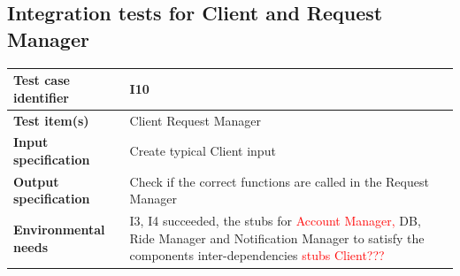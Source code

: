 \documentclass[a4paper,11pt]{report} %
\begin{document}
		\subsection{Integration tests for Client and Request Manager}
			\begin{minipage}{\linewidth}
			\end{minipage}		
		\begin{center}
			\renewcommand{\arraystretch}{1.2}
			\setlength{\tabcolsep}{24pt}
			\begin{tabular}{ l  p{9cm}}\hline
				\textbf{Test case identifier} & I10\\\hline
				\textbf{Test item(s)} & Client \textrightarrow Request Manager\\\hline
				\textbf{Input specification} & Create typical Client input \\\hline
				\textbf{Output specification} & Check if the correct functions are called in the Request Manager\\\hline
				\textbf{Environmental needs} &  I3, I4 succeeded, the stubs for \textcolor{red}{Account Manager, }DB, Ride Manager and Notification Manager to satisfy the components inter-dependencies \textcolor{red}{stubs Client???}\\\hline
			\end{tabular}
		\end{center}
		
\end{document}
